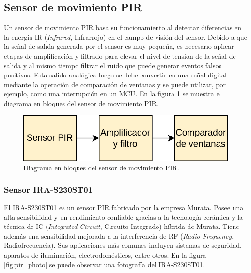\subsection{Sensor de movimiento PIR}
Un sensor de movimiento PIR basa su funcionamiento al detectar diferencias en la energía IR (\textit{Infrared}, Infrarrojo) en el campo de visión del sensor. Debido a que la señal de salida generada por el sensor es muy pequeña, es necesario aplicar etapas de amplificación y filtrado para elevar el nivel de tensión de la señal de salida y al mismo tiempo filtrar el ruido que puede generar eventos falsos positivos. Esta salida analógica luego se debe convertir en una señal digital mediante la operación de comparación de ventanas y se puede utilizar, por ejemplo, como una interrupción en un MCU. En la figura \ref{fig:move_blocks} se muestra el diagrama en bloques del sensor de movimiento PIR.

\begin{figure}[h]
	\centering
	\includegraphics[scale=0.25]{./Figures/move_blocks.png}
	\caption{Diagrama en bloques del sensor de movimiento PIR.}
	\label{fig:move_blocks}
\end{figure}

\subsubsection{Sensor IRA-S230ST01}
El IRA-S230ST01 es un sensor PIR fabricado por la empresa Murata. Posee una alta sensibilidad y un rendimiento confiable gracias a la tecnología cerámica y la técnica de IC (\textit{Integrated Circuit}, Circuito Integrado) híbrida de Murata. Tiene además una sensibilidad mejorada a la interferencia de RF (\textit{Radio Frequency}, Radiofrecuencia). Sus aplicaciones más comunes incluyen sistemas de seguridad, aparatos de iluminación, electrodomésticos, entre otros. En la figura \ref{fig:pir_photo} se puede observar una fotografía del IRA-S230ST01.

